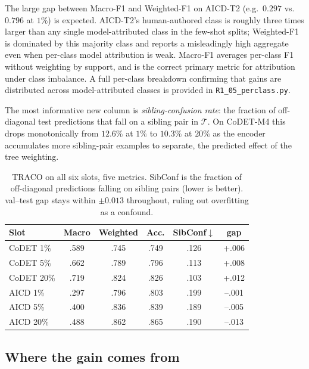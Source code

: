 ﻿\documentclass[11pt]{article}
\newcommand{\method}{\textsc{TRACO}\xspace}
\begin{document}
The large gap between Macro-F1 and Weighted-F1 on AICD-T2 (e.g.\
$0.297$ vs.\ $0.796$ at $1\%$) is expected. AICD-T2's human-authored
class is roughly three times larger than any single model-attributed
class in the few-shot splits; Weighted-F1 is dominated by this
majority class and reports a misleadingly high aggregate even when
per-class model attribution is weak. Macro-F1 averages per-class F1
without weighting by support, and is the correct primary metric for
attribution under class imbalance. A full per-class breakdown
confirming that gains are distributed across model-attributed classes
is provided in \texttt{R1\_05\_perclass.py}.

The most informative new column is
\emph{sibling-confusion rate}: the fraction of off-diagonal test
predictions that fall on a sibling pair in $\mathcal{T}$. On
CoDET-M4 this drops monotonically from $12.6\%$ at $1\%$ to $10.3\%$
at $20\%$ as the encoder accumulates more sibling-pair examples to
separate, the predicted effect of the tree weighting.

\begin{table}[t]
\centering\footnotesize
\setlength{\tabcolsep}{3pt}
\begin{tabular}{@{}l ccccc@{}}
\toprule
\textbf{Slot} & Macro & Weighted & Acc. & SibConf$\downarrow$ & gap \\
\midrule
CoDET 1\%   & .589 & .745 & .749 & .126 & +.006 \\
CoDET 5\%   & .662 & .789 & .796 & .113 & +.008 \\
CoDET 20\%  & .719 & .824 & .826 & .103 & +.012 \\
\midrule
AICD 1\%    & .297 & .796 & .803 & .199 & --.001 \\
AICD 5\%    & .400 & .836 & .839 & .189 & --.005 \\
AICD 20\%   & .488 & .862 & .865 & .190 & --.013 \\
\bottomrule
\end{tabular}
\caption{\label{tab:detailed}
\method on all six slots, five metrics. SibConf is the fraction of
off-diagonal predictions falling on sibling pairs (lower is better).
val--test gap stays within $\pm 0.013$ throughout, ruling out
overfitting as a confound.}
\end{table}

\subsection{Where the gain comes from}
\label{sec:where}
\end{document}
